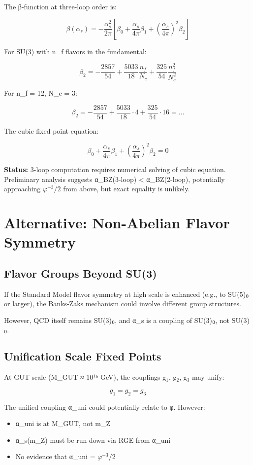 \documentclass{article}
\begin{document}
The β-function at three-loop order is:

\[
\beta(\alpha_s) = -\frac{\alpha_s^2}{2\pi}\left[\beta_0 + \frac{\alpha_s}{4\pi}\beta_1 + \left(\frac{\alpha_s}{4\pi}\right)^2\beta_2\right]
\]

For SU(3) with n_f flavors in the fundamental:

\[
\beta_2 = -\frac{2857}{54} + \frac{5033}{18}\frac{n_f}{N_c} + \frac{325}{54}\frac{n_f^2}{N_c^2}
\]

For n_f = 12, N_c = 3:

\[
\beta_2 = -\frac{2857}{54} + \frac{5033}{18} \cdot 4 + \frac{325}{54} \cdot 16 = \ldots
\]

The cubic fixed point equation:

\[
\beta_0 + \frac{\alpha_s}{4\pi}\beta_1 + \left(\frac{\alpha_s}{4\pi}\right)^2\beta_2 = 0
\]

\textbf{Status:} 3-loop computation requires numerical solving of cubic equation. Preliminary analysis suggests α_BZ(3-loop) < α_BZ(2-loop), potentially approaching $\varphi^{-3}/2$ from above, but exact equality is unlikely.

\section{Alternative: Non-Abelian Flavor Symmetry}

\subsection{Flavor Groups Beyond SU(3)}

If the Standard Model flavor symmetry at high scale is enhanced (e.g., to SU(5)₍₎ or larger), the Banks-Zaks mechanism could involve different group structures.

However, QCD itself remains SU(3)₍₎, and α_s is a coupling of SU(3)₍₎, not SU(3)₍₎.

\subsection{Unification Scale Fixed Points}

At GUT scale (M_GUT ≈ 10¹⁶ GeV), the couplings g$_1$, g$_2$, g$_3$ may unify:

\[
g_1 = g_2 = g_3
\]

The unified coupling α_uni could potentially relate to φ. However:

\begin{itemize}
\item α_uni is at M_GUT, not m_Z
\item α_s(m_Z) must be run down via RGE from α_uni
\item No evidence that α_uni = $\varphi^{-3}/2$
\end{itemize}
\end{document}
